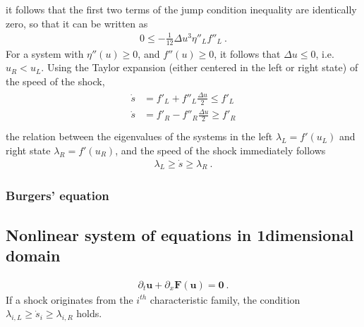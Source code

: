 \documentclass[letterpaper,10pt,english]{jupyterBook}
\begin{document}
\sphinxAtStartPar
it follows that the first two terms of the jump condition inequality are identically zero, so that it can be written as
\begin{equation*}
\begin{split}0 \le -\frac{1}{12} \Delta u^3 \eta''_L f''_L \ .\end{split}
\end{equation*}
\sphinxAtStartPar
For a system with  \(\eta''(u) \ge 0\), and  \(f''(u) \ge 0\), it follows that \(\Delta u \le 0\), i.e. \(u_R < u_L\). Using the Taylor expansion (either centered in the left or right state) of the speed of the shock,
\begin{equation*}
\begin{split}\begin{aligned}
  \dot{s} & = f'_L + f''_L \frac{\Delta u}{2} \le f'_L \\
  \dot{s} & = f'_R - f''_R \frac{\Delta u}{2} \ge f'_R \\
\end{aligned}\end{split}
\end{equation*}
\sphinxAtStartPar
the relation between the eigenvalues of the systems in the left \(\lambda_L = f'(u_L)\) and right state \(\lambda_R = f'(u_R)\), and the speed of the shock immediately follows
\begin{equation*}
\begin{split}\lambda_L \ge \dot{s} \ge \lambda_R \ .\end{split}
\end{equation*}

\subsubsection{Burgers’ equation}
\label{\detokenize{ch/pde/hyperbolic-entropy:burgers-equation}}\label{\detokenize{ch/pde/hyperbolic-entropy:pde-hyperbolic-entropy-1d-scalar-burgers}}



\subsection{Non\sphinxhyphen{}linear system of equations in 1\sphinxhyphen{}dimensional domain}
\label{\detokenize{ch/pde/hyperbolic-entropy:non-linear-system-of-equations-in-1-dimensional-domain}}\label{\detokenize{ch/pde/hyperbolic-entropy:pde-hyperbolic-entropy-1d-system}}\begin{equation*}
\begin{split}\partial_t \mathbf{u} + \partial_x \mathbf{F}(\mathbf{u}) = \mathbf{0} \ .\end{split}
\end{equation*}
\sphinxAtStartPar
If a shock originates from the \(i^{th}\) characteristic family, the condition \(\lambda_{i,L} \ge \dot{s}_i \ge \lambda_{i,R}\) holds.
\end{document}
